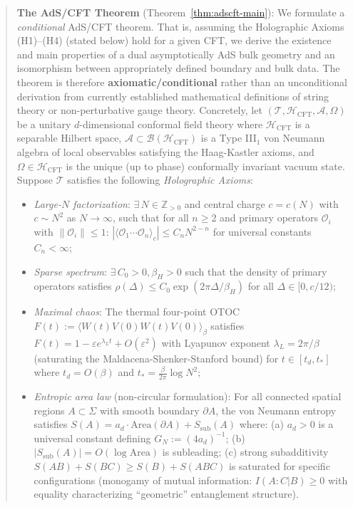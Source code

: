 \documentclass[12pt,a4paper]{article}
\begin{document}
\begin{abstract}
\textbf{The AdS/CFT Theorem} (Theorem~\ref{thm:adscft-main}): We formulate a \emph{conditional} AdS/CFT theorem. That is, assuming the Holographic Axioms (H1)--(H4) (stated below) hold for a given CFT, we derive the existence and main properties of a dual asymptotically AdS bulk geometry and an isomorphism between appropriately defined boundary and bulk data. The theorem is therefore \textbf{axiomatic/conditional} rather than an unconditional derivation from currently established mathematical definitions of string theory or non-perturbative gauge theory. Concretely, let $(\mathcal{T}, \mathcal{H}_{\text{CFT}}, \mathcal{A}, \Omega)$ be a unitary $d$-dimensional conformal field theory where $\mathcal{H}_{\text{CFT}}$ is a separable Hilbert space, $\mathcal{A} \subset \mathcal{B}(\mathcal{H}_{\text{CFT}})$ is a Type III$_1$ von Neumann algebra of local observables satisfying the Haag-Kastler axioms, and $\Omega \in \mathcal{H}_{\text{CFT}}$ is the unique (up to phase) conformally invariant vacuum state. Suppose $\mathcal{T}$ satisfies the following \emph{Holographic Axioms}:
\begin{itemize}
\item[\textbf{(H1)}] \emph{Large-$N$ factorization}: $\exists\, N \in \mathbb{Z}_{>0}$ and central charge $c = c(N)$ with $c \sim N^2$ as $N \to \infty$, such that for all $n \geq 2$ and primary operators $\mathcal{O}_i$ with $\|\mathcal{O}_i\| \leq 1$: $|\langle\mathcal{O}_1\cdots\mathcal{O}_n\rangle_c| \leq C_n N^{2-n}$ for universal constants $C_n < \infty$;
\item[\textbf{(H2)}] \emph{Sparse spectrum}: $\exists\, C_0 > 0, \beta_H > 0$ such that the density of primary operators satisfies $\rho(\Delta) \leq C_0 \exp(2\pi\Delta/\beta_H)$ for all $\Delta \in [0, c/12)$;
\item[\textbf{(H3)}] \emph{Maximal chaos}: The thermal four-point OTOC $F(t) := \langle W(t)V(0)W(t)V(0)\rangle_\beta$ satisfies $F(t) = 1 - \varepsilon e^{\lambda_L t} + O(\varepsilon^2)$ with Lyapunov exponent $\lambda_L = 2\pi/\beta$ (saturating the Maldacena-Shenker-Stanford bound) for $t \in [t_d, t_*]$ where $t_d = O(\beta)$ and $t_* = \frac{\beta}{2\pi}\log N^2$;
\item[\textbf{(H4)}] \emph{Entropic area law} (non-circular formulation): For all connected spatial regions $A \subset \Sigma$ with smooth boundary $\partial A$, the von Neumann entropy satisfies $S(A) = a_d \cdot \text{Area}(\partial A) + S_{\text{sub}}(A)$ where: (a) $a_d > 0$ is a universal constant defining $G_N := (4a_d)^{-1}$; (b) $|S_{\text{sub}}(A)| = O(\log\text{Area})$ is subleading; (c) strong subadditivity $S(AB) + S(BC) \geq S(B) + S(ABC)$ is saturated for specific configurations (monogamy of mutual information: $I(A:C|B) \geq 0$ with equality characterizing ``geometric'' entanglement structure).

\end{itemize}
\end{abstract}
\end{document}
